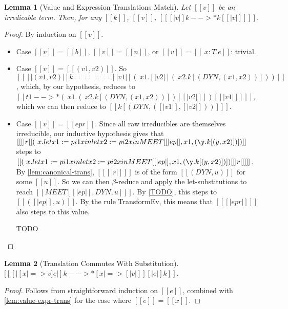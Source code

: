\documentclass[11pt]{article}
\newtheorem{lemma}{Lemma}[section]
\begin{document}
\begin{lemma}[Value and Expression Translations Match]
    \label{lem:value-expr-trans}
Let $[[v]]$ be an irredicable term. Then, for any $[[k]]$, $[[v]]$, $[[ [|v|]k -->* k [ [|v|] ]  ]]$.
\end{lemma}
\begin{proof}
    By induction on $[[v]]$.

    \begin{itemize}
        \item Case $[[v]] = [[b]]$, $[[v]] = [[n]]$, or $[[v]] = [[\ x : T . e]]$: trivial.
        \item Case $[[v]] = [[(v1, v2)]]$.
        So $[[ [|(v1, v2)|]k ==== [| v1 |](\ x1 . [|v2|](\ x2 . k[(DYN, (x1, x2))] ) )  ]]$,
        which, by our hypothesis, reduces to  $[[t1 -->* (\ x1 . (\ x2 . k[(DYN, (x1, x2))] )[ [|v2|] ] )[ [|v1|] ] ]]$,
        which we can then reduce to $[[k[(DYN, ([|v1|],[|v2|]))] ]]$.
        \item Case $[[v]] = [[ep r]]$. Since all raw irreducibles are themselves irreducible,
            our inductive hypothesis gives that
            $[[ [|r|] (\ x . let x1 := pi1 x in let x2 := pi2 x in MEET [ [|ep|],x1, (\y . k [(y,x2)]) ] )]]$
            steps to $[[(\ x . let x1 := pi1 x in let x2 := pi2 x in MEET [ [|ep|],x1, (\y . k [(y,x2)]) ] )[ [|r|] ] ]]$.
            By \autoref{lem:canonical-trans}, $[[ [|r|] ]]$ is of the form
            $[[(DYN, u)]]$ for some $[[u]]$.
            So we can then $\beta$-reduce and apply the let-substitutions to reach $[[ MEET[ [|ep|], DYN, u ]  ]]$.
            By \autoref{TODO}, this steps to $[[([|ep|], u)]]$.
            By the rule TransformEv, this means that $[[ [|ep r|] ]]$ also steps to this value. 


        TODO
    \end{itemize}
\end{proof}

\begin{lemma}[Translation Commutes With Substitution]
    $[[ [|[x |=> v]e|]k -->* [x |=> [|v|] ][|e|]k   ]]$.
    \end{lemma}
    \begin{proof}
        Follows from straightforward induction on $[[e]]$, combined with \autoref{lem:value-expr-trans}
        for the case where $[[e]]=[[x]]$.
    \end{proof}
\end{document}
